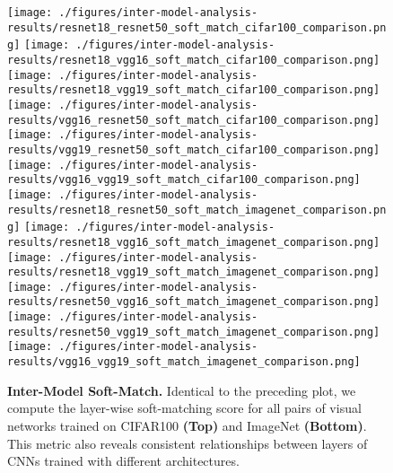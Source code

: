 \begin{figure*}
    \centering
    \texttt{[image: ./figures/inter-model-analysis-results/resnet18\_resnet50\_soft\_match\_cifar100\_comparison.png]}\hfill
    \texttt{[image: ./figures/inter-model-analysis-results/resnet18\_vgg16\_soft\_match\_cifar100\_comparison.png]}\hfill
    \texttt{[image: ./figures/inter-model-analysis-results/resnet18\_vgg19\_soft\_match\_cifar100\_comparison.png]}\hfill 
    \texttt{[image: ./figures/inter-model-analysis-results/vgg16\_resnet50\_soft\_match\_cifar100\_comparison.png]}\hfill
    \texttt{[image: ./figures/inter-model-analysis-results/vgg19\_resnet50\_soft\_match\_cifar100\_comparison.png]}\hfill 
    \texttt{[image: ./figures/inter-model-analysis-results/vgg16\_vgg19\_soft\_match\_cifar100\_comparison.png]}\\
    
    \texttt{[image: ./figures/inter-model-analysis-results/resnet18\_resnet50\_soft\_match\_imagenet\_comparison.png]}\hfill
    \texttt{[image: ./figures/inter-model-analysis-results/resnet18\_vgg16\_soft\_match\_imagenet\_comparison.png]}\hfill
    \texttt{[image: ./figures/inter-model-analysis-results/resnet18\_vgg19\_soft\_match\_imagenet\_comparison.png]}\hfill 
    \texttt{[image: ./figures/inter-model-analysis-results/resnet50\_vgg16\_soft\_match\_imagenet\_comparison.png]}\hfill
    \texttt{[image: ./figures/inter-model-analysis-results/resnet50\_vgg19\_soft\_match\_imagenet\_comparison.png]}\hfill 
    \texttt{[image: ./figures/inter-model-analysis-results/vgg16\_vgg19\_soft\_match\_imagenet\_comparison.png]}
    
    \caption{\textbf{Inter-Model Soft-Match.} Identical to the preceding plot, we compute the layer-wise soft-matching score for all pairs of visual networks trained on CIFAR100 \textbf{(Top)} and ImageNet \textbf{(Bottom)}. This metric also reveals consistent relationships between layers of CNNs trained with different architectures.}
    \label{tab:sm_inter_model} 
\end{figure*}